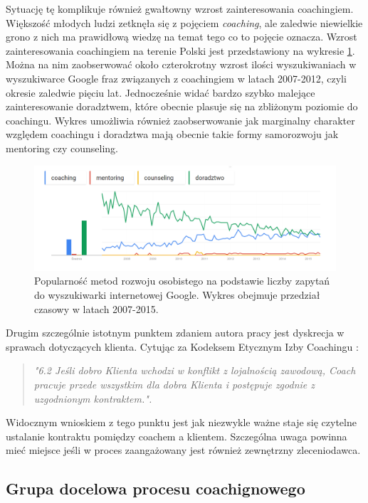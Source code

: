 Sytuację tę komplikuje również gwałtowny wzrost zainteresowania coachingiem. Większość młodych ludzi zetknęła się z
pojęciem \emph{coaching}, ale zaledwie niewielkie grono z nich ma prawidłową wiedzę na temat tego co to pojęcie oznacza.
Wzrost zainteresowania coachingiem na terenie Polski jest przedstawiony na wykresie \ref{wykres}. Można na nim zaobserwować
około czterokrotny wzrost ilości wyszukiwaniach w wyszukiwarce Google fraz związanych z coachingiem w latach 2007-2012,
czyli okresie zaledwie pięciu lat. Jednocześnie widać bardzo szybko malejące zainteresowanie doradztwem, które obecnie plasuje się
na zbliżonym poziomie do coachingu. Wykres umożliwia również zaobserwowanie jak marginalny charakter względem coachingu i
doradztwa mają obecnie takie formy samorozwoju jak mentoring czy counseling.

\begin{figure}[!ht]
  \centering
  \includegraphics[width=17cm]{img/popularnosc}
  \caption{Popularność metod rozwoju osobistego na podstawie liczby zapytań do wyszukiwarki internetowej Google. Wykres obejmuje przedział czasowy w latach 2007-2015.}
  \label{wykres}
\end{figure}

Drugim szczególnie istotnym punktem zdaniem autora pracy jest dyskrecja w sprawach dotyczących klienta. Cytując za Kodeksem Etycznym Izby Coachingu \cite{kodeksib}:
\begin{quote}
\centering
\emph{"6.2 Jeśli dobro Klienta wchodzi w konflikt z lojalnością zawodową, Coach pracuje przede wszystkim dla dobra Klienta i postępuje zgodnie z uzgodnionym kontraktem.".}
\end{quote}
Widocznym wnioskiem z tego punktu jest jak niezwykle ważne staje się czytelne ustalanie kontraktu pomiędzy coachem a klientem.
Szczególna uwaga powinna mieć miejsce jeśli w proces zaangażowany jest również zewnętrzny zleceniodawca.

\subsection{Grupa docelowa procesu coachignowego}

